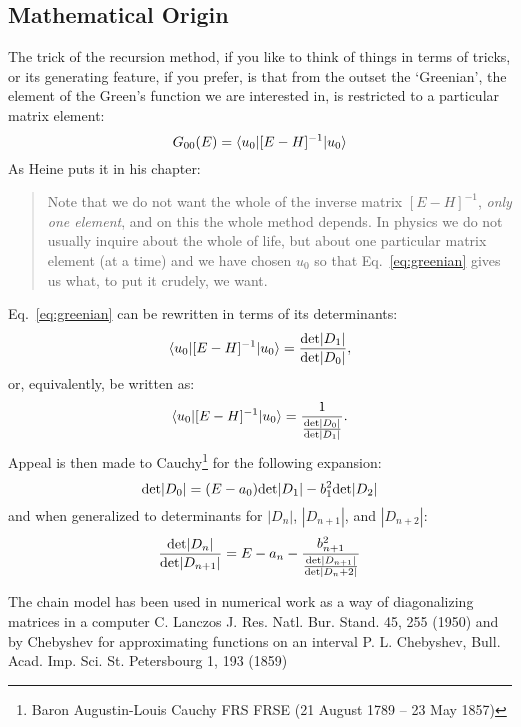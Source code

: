 \subsection{Mathematical Origin}
The trick of the recursion method, if you like to think of things in terms of tricks, 
or its generating feature, if you prefer, is that from the outset the `Greenian', the element
of the Green's function we are interested in, is restricted to a particular matrix element: 
%
\begin{equation}
\label{eq:greenian}
G_{00}(E) = \langle u_{0}|[E-H]^{-1}|u_{0}\rangle 
\end{equation}
%
As Heine puts it in his chapter:
%
\begin{quote}
Note that we do not want the whole of the inverse matrix $[E-H]^{-1}$, 
\emph{only one element}, and on this the whole method depends. In physics we do not
usually inquire about the whole of life, but about one particular matrix element (at a time) and we have chosen
$u_{0}$ so that Eq.~\ref{eq:greenian} gives us what, to put it crudely, we want.
\end{quote}

Eq.~\ref{eq:greenian} can be rewritten in terms of its determinants:
%
\begin{equation}
\label{eq:greendet}
\langle u_{0}|[E-H]^{-1}|u_{0}\rangle = \frac{{\rm det}|D_{1}|}{{\rm det}|D_{0}|},
\end{equation}
%
or, equivalently, be written as:
%
\begin{equation}
\label{eq:greendet}
\langle u_{0}|[E-H]^{-1}|u_{0}\rangle = \frac{1}{\frac{{\rm det}|D_{0}|}{{\rm det}|D_{1}|}}.
\end{equation}
%
Appeal is then made to Cauchy\footnote{Baron Augustin-Louis Cauchy FRS FRSE (21 August 1789 – 23 May 1857)} 
for the following expansion:
%
\begin{equation}
{\rm det}|D_{0}| = (E-a_{0}){\rm det}|D_{1}| - b^{2}_{1}{\rm det}|D_{2}|
\end{equation}
%
and when generalized to determinants for $|D_{n}|$, $|D_{n+1}|$, and $|D_{n+2}|$:
%
\begin{equation}
\frac{{\rm det}|D_{n}|}{{\rm det}|D_{n+1}|} = E -a_{n} - \frac{b^{2}_{n+1}}{\frac{{\rm det}|D_{n+1}|}{{\rm det}|D_n+2|}}
\end{equation}

The chain model has been used in numerical work as a way of diagonalizing matrices in a computer 
C. Lanczos J. Res. Natl. Bur. Stand. 45, 255 (1950) and
by Chebyshev for approximating functions on an interval
P. L. Chebyshev, Bull. Acad. Imp. Sci. St. Petersbourg 1, 193 (1859)

